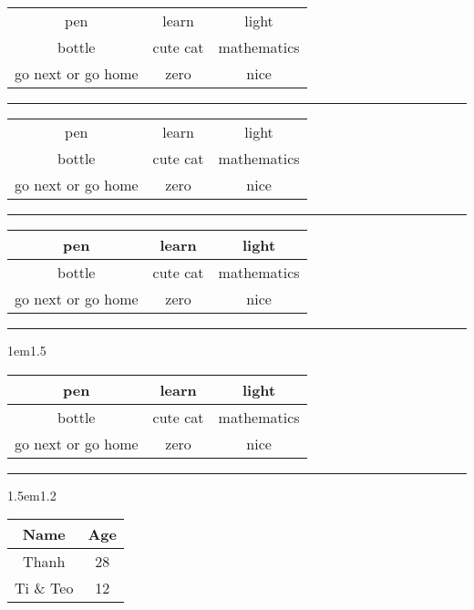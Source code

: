 \documentclass[12pt]{article}
\newcommand{\hr}[1][0.4pt] {\begin{center} \noindent\vspace{5mm} \textcolor{lightgray}{ \rule{\textwidth}{#1} } \vspace{5mm} \end{center}}
\newenvironment{my-table-env}[2]
    {
    \setlength{\tabcolsep}{ #1 }
    \renewcommand{\arraystretch}{ #2 }
    }
    {
    }
\begin{document}
\begin{center}

    \begin{tabular}{c c c}
        pen & learn & light \\
        bottle & cute cat & mathematics \\
        go next or go home & zero & nice
    \end{tabular}

    \hr

    \begin{tabular}{|c|c c|}
        pen & learn & light \\
        bottle & cute cat & mathematics \\
        go next or go home & zero & nice
    \end{tabular}

    \hr

    \begin{tabular}{||c|c|c||}
        \hline
        pen & learn & light \\
        \hline
        bottle & cute cat & mathematics \\
        \hline
        go next or go home & zero & nice \\
        \hline
    \end{tabular}

    \hr

    \begin{my-table-env}{1em}{1.5} %
        \begin{tabular}{|c|c|c|}
            \hline
            pen & learn & light \\
            \hline
            bottle & cute cat & mathematics \\
            \hline
            go next or go home & zero & nice \\
            \hline
        \end{tabular}
    \end{my-table-env}

    \hr

    \begin{my-table-env}{1.5em}{1.2} %
        \begin{tabular}{|c|c|}
            \hline
            \rule{0pt}{5ex} %
            {\Large\textbf{Name}} & {\Large\textbf{Age}}
            \\[2ex] %
            \hline
            Thanh & 28 \\
            \hline
            Ti \& Teo & 12 \\
            \hline
        \end{tabular}
    \end{my-table-env}

\end{center}
\end{document}
